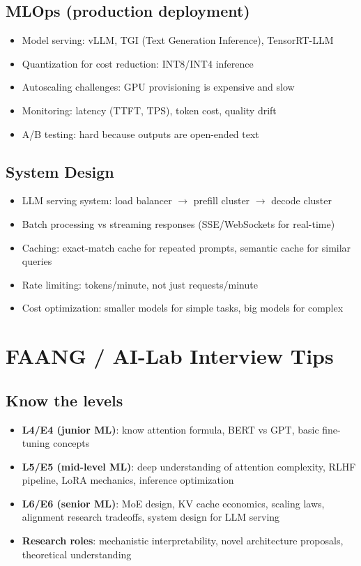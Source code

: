 \documentclass[11pt]{article}
\providecommand{\tightlist}{\setlength{\itemsep}{1pt}\setlength{\parskip}{0pt}}
\begin{document}
\subsection{MLOps (production deployment)}\label{mlops-production-deployment}

\begin{itemize}
\tightlist
\item
  Model serving: vLLM, TGI (Text Generation Inference), TensorRT-LLM
\item
  Quantization for cost reduction: INT8/INT4 inference
\item
  Autoscaling challenges: GPU provisioning is expensive and slow
\item
  Monitoring: latency (TTFT, TPS), token cost, quality drift
\item
  A/B testing: hard because outputs are open-ended text
\end{itemize}

\subsection{System Design}\label{system-design}

\begin{itemize}
\tightlist
\item
  LLM serving system: load balancer \(\rightarrow\) prefill cluster \(\rightarrow\) decode cluster
\item
  Batch processing vs streaming responses (SSE/WebSockets for real-time)
\item
  Caching: exact-match cache for repeated prompts, semantic cache for similar queries
\item
  Rate limiting: tokens/minute, not just requests/minute
\item
  Cost optimization: smaller models for simple tasks, big models for complex
\end{itemize}

\section{FAANG / AI-Lab Interview Tips}\label{faang--ai-lab-interview-tips}

\subsection{Know the levels}\label{know-the-levels}

\begin{itemize}
\tightlist
\item
  \textbf{L4/E4 (junior ML)}: know attention formula, BERT vs GPT, basic fine-tuning concepts
\item
  \textbf{L5/E5 (mid-level ML)}: deep understanding of attention complexity, RLHF pipeline, LoRA mechanics, inference optimization
\item
  \textbf{L6/E6 (senior ML)}: MoE design, KV cache economics, scaling laws, alignment research tradeoffs, system design for LLM serving
\item
  \textbf{Research roles}: mechanistic interpretability, novel architecture proposals, theoretical understanding
\end{itemize}
\end{document}
